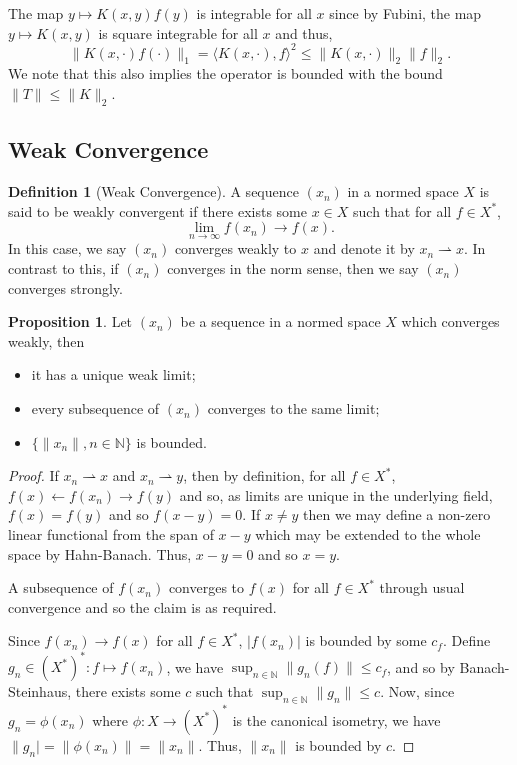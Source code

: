 \documentclass[]{article}
\theoremstyle{definition}
\theoremstyle{definition}
\newtheorem{definition}{Definition}[section]
\newtheorem{proposition}{Proposition}[section]
\newcommand{\weak}{\rightharpoonup}
\begin{document}
The map \(y \mapsto K(x, y)f(y)\) is integrable for all \(x\) since by 
Fubini, the map \(y \mapsto K(x, y)\) is square integrable for all \(x\) 
and thus, 
\[\|K(x, \cdot)f(\cdot)\|_1 = \langle K(x, \cdot), f \rangle^2 \le 
  \|K(x, \cdot)\|_2 \|f\|_2.\]
We note that this also implies the operator is bounded with the bound 
\(\|T\| \le \|K\|_2\).

\subsection{Weak Convergence}

\begin{definition}[Weak Convergence]
  A sequence \((x_n)\) in a normed space \(X\) is said to be weakly convergent 
  if there exists some \(x \in X\) such that for all \(f \in X^*\), 
  \[\lim_{n \to \infty} f(x_n) \to f(x).\]
  In this case, we say \((x_n)\) converges weakly to \(x\) and denote it by 
  \(x_n \weak x\). In contrast to this, if \((x_n)\) converges in the norm
  sense, then we say \((x_n)\) converges strongly.
\end{definition}

\begin{proposition}
  Let \((x_n)\) be a sequence in a normed space \(X\) which converges weakly, 
  then 
  \begin{itemize}
    \item it has a unique weak limit;
    \item every subsequence of \((x_n)\) converges to the same limit;
    \item \(\{\|x_n\|, n \in \mathbb{N}\}\) is bounded.
  \end{itemize}
\end{proposition}
\begin{proof}
  If \(x_n \weak x\) and \(x_n \weak y\), then by definition, for all 
  \(f \in X^*\), \(f(x) \leftarrow f(x_n) \to f(y)\) and so, as limits are 
  unique in the underlying field, \(f(x) = f(y)\) and so \(f(x - y) = 0\).
  If \(x \neq y\) then we may define a non-zero linear functional from the 
  span of \(x - y\) which may be extended to the whole space by Hahn-Banach. 
  Thus, \(x - y = 0\) and so \(x = y\).

  A subsequence of \(f(x_n)\) converges to \(f(x)\) for all \(f \in X^*\) through 
  usual convergence and so the claim is as required.

  Since \(f(x_n) \to f(x)\) for all \(f \in X^*\), \(|f(x_n)|\) is bounded by 
  some \(c_f\). Define \(g_n \in (X^*)^* : f \mapsto f(x_n)\), we have 
  \(\sup_{n \in \mathbb{N}} \|g_n(f)\| \le c_f\), and so by Banach-Steinhaus, 
  there exists some \(c\) such that \(\sup_{n \in \mathbb{N}} \|g_n\| \le c\).
  Now, since \(g_n = \phi(x_n)\) where \(\phi : X \to (X^*)^*\) is the canonical 
  isometry, we have \(\|g_n| = \|\phi(x_n)\| = \|x_n\|\). Thus, \(\|x_n\|\) is 
  bounded by \(c\). 
\end{proof}
\end{document}
